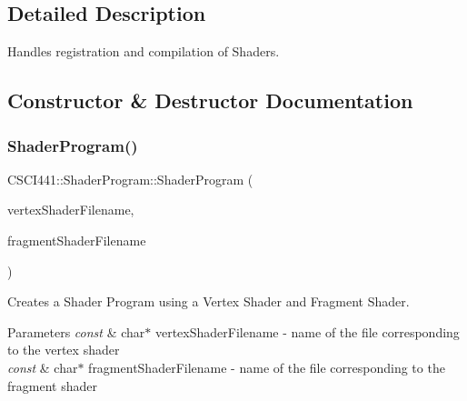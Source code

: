 \subsection{Detailed Description}
Handles registration and compilation of Shaders. 

\subsection{Constructor \& Destructor Documentation}
\mbox{\label{class_c_s_c_i441_1_1_shader_program_a0f51bed7fb1b24075b96be6c7a490f8d}} 
\subsubsection{\texorpdfstring{Shader\+Program()}{ShaderProgram()}\hspace{0.1cm}{\footnotesize\ttfamily [1/4]}}
{\footnotesize\ttfamily C\+S\+C\+I441\+::\+Shader\+Program\+::\+Shader\+Program (\begin{DoxyParamCaption}\item[{const char $\ast$}]{vertex\+Shader\+Filename,  }\item[{const char $\ast$}]{fragment\+Shader\+Filename }\end{DoxyParamCaption})}



Creates a Shader Program using a Vertex Shader and Fragment Shader. 


\begin{DoxyParams}{Parameters}
{\em const} & char$\ast$ vertex\+Shader\+Filename -\/ name of the file corresponding to the vertex shader \\
\hline
{\em const} & char$\ast$ fragment\+Shader\+Filename -\/ name of the file corresponding to the fragment shader \\
\hline
\end{DoxyParams}
\mbox{\label{class_c_s_c_i441_1_1_shader_program_af561da1984872a47dba91e30a5aec14d}} 

